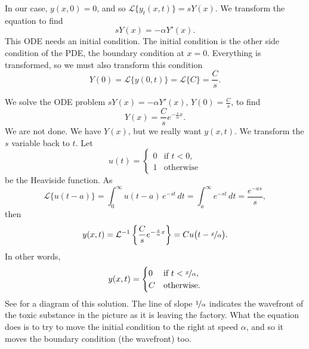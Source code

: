 \begin{example}
In our case,
$y(x,0)=0$, and so
${\mathcal L} \bigl\{ y_t(x,t) \bigr\} = sY(x)$.  We transform the equation
to find
\begin{equation*}
sY(x) = -\alpha Y'(x) .
\end{equation*}
This ODE needs an initial condition.  The initial condition is the
other side condition of the PDE\@, the boundary condition at $x=0$.  Everything
is transformed, so we must also transform this condition
\begin{equation*}
Y(0) = 
{\mathcal L} \bigl\{ y(0,t) \bigr\} 
=
{\mathcal L} \bigl\{ C \bigr\} 
=
\frac{C}{s} .
\end{equation*}

We solve the ODE problem $sY(x) = -\alpha Y'(x)$, $Y(0) = \frac{C}{s}$, to find
\begin{equation*}
Y(x) = \frac{C}{s} e^{-\frac{s}{\alpha} x} .
\end{equation*}
We are not done.
We have $Y(x)$, but we really want $y(x,t)$.
We transform the $s$ variable back to $t$.
Let 
\begin{equation*}
u(t) = \begin{cases} 0 & \text{if $t < 0$}, \\ 1 & \text{otherwise}
\end{cases}
\end{equation*}
be the Heaviside function.
As
\begin{equation*}
{\mathcal L} \bigl\{ u(t-a) \bigr\} =
\int_0^\infty u(t-a) \, e^{-st} \,dt
=
\int_a^\infty e^{-st} \,dt
=
\frac{e^{-as}}{s} ,
\end{equation*}
then
\begin{equation*}
y(x,t) = {\mathcal L}^{-1} \left\{
\frac{C}{s} e^{-\frac{s}{\alpha} x}
\right\}
=
C u\bigl(t-\nicefrac{x}{\alpha}\bigr) .
\end{equation*}
In other words,
\begin{equation*}
y(x,t) =
\begin{cases}
0 & \text{if $t < \nicefrac{x}{\alpha}$}, \\
C & \text{otherwise.}
\end{cases}
\end{equation*}
See  for a diagram of this
solution.  The line of slope $\nicefrac{1}{\alpha}$ indicates
the wavefront of the toxic substance in the picture as it is leaving the
factory.
What the equation does is to try to move the initial condition to the right
at speed $\alpha$,
and so it moves the boundary condition (the wavefront) too.


\end{example}
